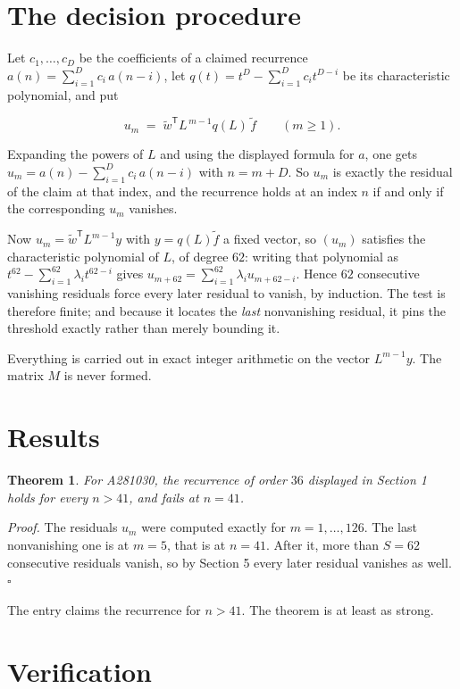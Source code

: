 \documentclass[11pt]{article}
\newtheorem{theorem}{Theorem}
\theoremstyle{definition}
\begin{document}
\section{The decision procedure}

Let $c_1,\dots,c_D$ be the coefficients of a claimed recurrence $a(n) = \sum_{i=1}^{D} c_i\,a(n-i)$, let $q(t) = t^{D} - \sum_{i=1}^{D} c_i t^{D-i}$ be its characteristic polynomial, and put

\[u_m \;=\; \tilde w^{\mathsf T} L^{\,m-1} q(L)\,\tilde f \qquad (m \ge 1).\]

Expanding the powers of $L$ and using the displayed formula for $a$, one gets $u_m = a(n) - \sum_{i=1}^{D} c_i\,a(n-i)$ with $n = m + D$. So $u_m$ is exactly the residual of the claim at that index, and the recurrence holds at an index $n$ if and only if the corresponding $u_m$ vanishes.

Now $u_m = \tilde w^{\mathsf T} L^{m-1} y$ with $y = q(L)\tilde f$ a fixed vector, so $(u_m)$ satisfies the characteristic polynomial of $L$, of degree $62$: writing that polynomial as $t^{62} - \sum_{i=1}^{62} \lambda_i t^{62-i}$ gives $u_{m+62} = \sum_{i=1}^{62} \lambda_i u_{m+62-i}$. Hence $62$ consecutive vanishing residuals force every later residual to vanish, by induction. The test is therefore finite; and because it locates the {\itshape last} nonvanishing residual, it pins the threshold exactly rather than merely bounding it.

Everything is carried out in exact integer arithmetic on the vector $L^{m-1}y$. The matrix $M$ is never formed.

\section{Results}

\begin{theorem} For A281030, the recurrence of order $36$ displayed in Section 1 holds for every $n > 41$, and fails at $n = 41$.\end{theorem}

{\itshape Proof.} The residuals $u_m$ were computed exactly for $m = 1,\dots,126$. The last nonvanishing one is at $m = 5$, that is at $n = 41$. After it, more than $S = 62$ consecutive residuals vanish, so by Section 5 every later residual vanishes as well. $\square$

The entry claims the recurrence for $n > 41$. The theorem is at least as strong.

\section{Verification}
\end{document}
